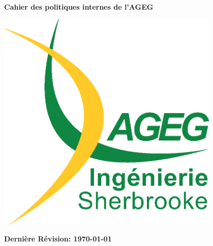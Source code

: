 \setcounter{reglement}{0}
\renewcommand{\thepage}{PL \arabic{page}}
\begin{titlepage}
\begin{center}

\vfill~\\[1cm]
{\Huge \bfseries Cahier des politiques internes de l'AGEG}

\vfill

\includegraphics[width=0.8\textwidth]{./Images/A11-LogoAGEG-002-AJC.eps}~\\[1cm]

\vfill

{\bfseries \LARGE Dernière Révision: \today}

\end{center}
\end{titlepage}
